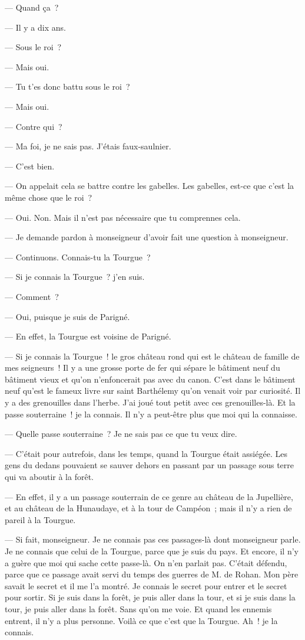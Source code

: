 \documentclass[french,twoside]{book} %
\begin{document}
 — Quand ça ?\par
— Il y a dix ans.\par
— Sous le roi ?\par
— Mais oui.\par
— Tu t’es donc battu sous le roi ?\par
— Mais oui.\par
— Contre qui ?\par
— Ma foi, je ne sais pas. J’étais faux-saulnier.\par
— C’est bien.\par
— On appelait cela se battre contre les gabelles. Les gabelles, est-ce que c’est la même chose que le roi ?\par
— Oui. Non. Mais il n’est pas nécessaire que tu comprennes cela.\par
— Je demande pardon à monseigneur d’avoir fait une question à monseigneur.\par
— Continuons. Connais-tu la Tourgue ?\par
— Si je connais la Tourgue ? j’en suis.\par
— Comment ?\par
— Oui, puisque je suis de Parigné.\par
— En effet, la Tourgue est voisine de Parigné.\par
— Si je connais la Tourgue ! le gros château rond qui est le château de famille de mes seigneurs ! Il y a une grosse porte de fer qui sépare le bâtiment neuf du bâtiment vieux et qu’on n’enfoncerait pas avec du canon. C’est dans le bâtiment neuf qu’est le fameux livre sur saint Barthélemy qu’on venait voir par curiosité. Il y a des grenouilles dans l’herbe. J’ai joué tout petit avec ces grenouilles-là. Et la passe souterraine ! je la connais. Il n’y a peut-être plus que moi qui la connaisse.\par
 — Quelle passe souterraine ? Je ne sais pas ce que tu veux dire.\par
— C’était pour autrefois, dans les temps, quand la Tourgue était assiégée. Les gens du dedans pouvaient se sauver dehors en passant par un passage sous terre qui va aboutir à la forêt.\par
— En effet, il y a un passage souterrain de ce genre au château de la Jupellière, et au château de la Hunaudaye, et à la tour de Campéon ; mais il n’y a rien de pareil à la Tourgue.\par
— Si fait, monseigneur. Je ne connais pas ces passages-là dont monseigneur parle. Je ne connais que celui de la Tourgue, parce que je suis du pays. Et encore, il n’y a guère que moi qui sache cette passe-là. On n’en parlait pas. C’était défendu, parce que ce passage avait servi du temps des guerres de M. de Rohan. Mon père savait le secret et il me l’a montré. Je connais le secret pour entrer et le secret pour sortir. Si je suis dans la forêt, je puis aller dans la tour, et si je suis dans la tour, je puis aller dans la forêt. Sans qu’on me voie. Et quand les ennemis entrent, il n’y a plus personne. Voilà ce que c’est que la Tourgue. Ah ! je la connais.\par
\end{document}

